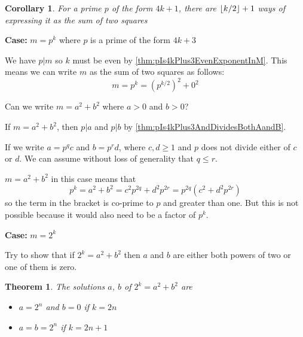 \documentclass[11pt]{amsart}
\newtheorem{theorem}{Theorem}[section]
\newtheorem{corollary}{Corollary}[section]
\begin{document}
\begin{corollary}
For a prime $p$ of the form $4k+1$, there are $ \left\lfloor {k/2} \right\rfloor  + 1$ ways of expressing it as the sum of two squares
\end{corollary}




\vspace{2em}

\textbf{Case:} $m = p^{k}$ where $p$ is a prime of the form $4k+3$


We have $p | m$ so $k$ must be even by \cref{thm:pIs4kPlus3EvenExponentInM}. This means we can write $m$ as the sum of two squares as follows:
$$
m = p^{k} = \left( p^{k/2} \right)^{2} + 0^{2}
$$

Can we write $m = a^{2} + b^{2}$ where $a>0$ and $b>0$?

If $m = a^{2} + b^{2}$, then $p|a$ and $p|b$ by \cref{thm:pIs4kPlus3AndDividesBothAandB}.

If we write $a = p^{q} c$ and $b = p^{r} d$, where $c,d \ge 1$ and $p$ does not divide either of $c$ or $d$. We can assume without loss of generality that $q \le r$.

$m = a^{2} + b^{2}$ in this case means that
$$
p^{k} = a^{2} + b^{2} = c^{2} p^{2q} + d^{2} p^{2r} = 
p^{2q} \left( c^{2} + d^{2} p^{2r} \right)
$$
so the term in the bracket is co-prime to $p$ and greater than one. But this is not possible because it would also need to be a factor of $p^{k}$.




\vspace{2em}

\textbf{Case:} $m = 2^{k}$ 

Try to show that if $2^{k} = a^{2} + b^{2}$ then $a$ and $b$ are either both powers of two or one of them is zero.

\vspace{2em}

\begin{theorem}
The solutions $a$, $b$ of $2^{k} = a^{2} + b^{2}$ are
\begin{itemize}
\item
$a = 2^{n}$ and $b = 0$ if $k = 2n$
\item
$a = b = 2^{n}$ if $k = 2n + 1$
\end{itemize}
\end{theorem}
\end{document}
